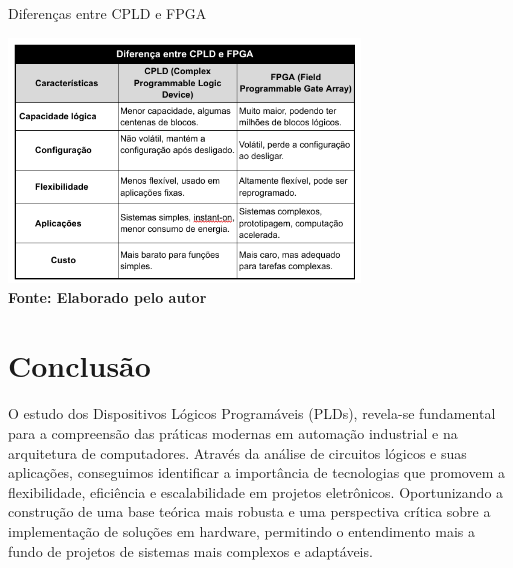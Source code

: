 
\begin{quadro}[H]
	\centering	
	\caption{Diferenças entre CPLD e FPGA}
	\vspace{-0.4cm}
	\includegraphics[width=0.7\textwidth]{figuras/Tabela3.png}
	 \vspace{-0.2cm}
	\\\textbf{\footnotesize Fonte: Elaborado pelo autor }
	\label{table: Tabela3}
\end{quadro}
\vspace{-0.5cm}

\section{\esp Conclusão}

O estudo dos Dispositivos Lógicos Programáveis (PLDs), revela-se fundamental para a compreensão das práticas modernas em automação industrial e na arquitetura de computadores. Através da análise de circuitos lógicos e suas aplicações, conseguimos identificar a importância de tecnologias que promovem a flexibilidade, eficiência e escalabilidade em projetos eletrônicos. Oportunizando a construção de uma base teórica mais robusta e uma perspectiva crítica sobre a implementação de soluções em hardware, permitindo o entendimento mais a fundo de projetos de sistemas mais complexos e adaptáveis.



